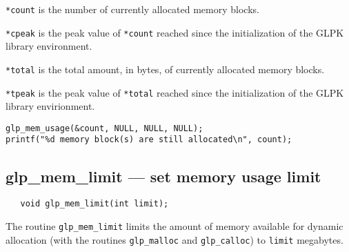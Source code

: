 \verb|*count| is the number of currently allocated memory blocks.

\verb|*cpeak| is the peak value of \verb|*count| reached since the
initialization of the GLPK library environment.

\verb|*total| is the total amount, in bytes, of currently allocated
memory blocks.

\verb|*tpeak| is the peak value of \verb|*total| reached since the
initialization of the GLPK library envirionment.


\begin{footnotesize}
\begin{verbatim}
glp_mem_usage(&count, NULL, NULL, NULL);
printf("%d memory block(s) are still allocated\n", count);
\end{verbatim}
\end{footnotesize}

\subsection{glp\_mem\_limit --- set memory usage limit}

\synopsis

\begin{verbatim}
   void glp_mem_limit(int limit);
\end{verbatim}

\description

The routine \verb|glp_mem_limit| limits the amount of memory available
for dynamic allocation (with the routines \verb|glp_malloc| and
\verb|glp_calloc|) to \verb|limit| megabytes.

